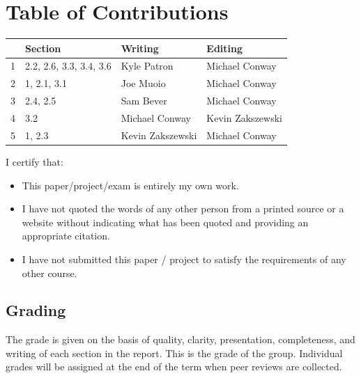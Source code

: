 \documentclass{article}
\begin{document}

\newpage
\section*{\centering Table of Contributions}
\begin{tabular}{| l | l | l | l |}
    \hline
     & Section & Writing & Editing \\
    \hline \hline
		1 & 2.2, 2.6, 3.3, 3.4, 3.6 & Kyle Patron & Michael Conway\\ \hline
		2 & 1, 2.1, 3.1 & Joe Muoio & Michael Conway\\ \hline
		3 & 2.4, 2.5 & Sam Bever & Michael Conway\\ \hline
		4 & 3.2 & Michael Conway & Kevin Zakszewski \\ \hline
		5 & 1, 2.3 & Kevin Zakszewski & Michael Conway \\ \hline
\end{tabular}
\newpage
\noindent I certify that:
\begin{itemize}
\item This paper/project/exam is entirely my own work.
\item I have not quoted the words of any other person from a printed source or a website without indicating what has been quoted and providing an appropriate citation.
\item I have not submitted this paper / project to satisfy the requirements of any other course.
\end{itemize}

\vspace{1cm}
\noindent{}


\vspace{0.5cm}
\noindent{}

\vspace{0.5cm}
\noindent{}

\vspace{0.5cm}
\noindent{}

\vspace{0.5cm}
\noindent{}

\vspace{\fill}
\subsection*{Grading}
The grade is given on the basis of quality, clarity, presentation, completeness, and writing of each section in the report. This is the grade of the group. Individual grades will be assigned at the end of the term when peer reviews are collected.
\end{document}
